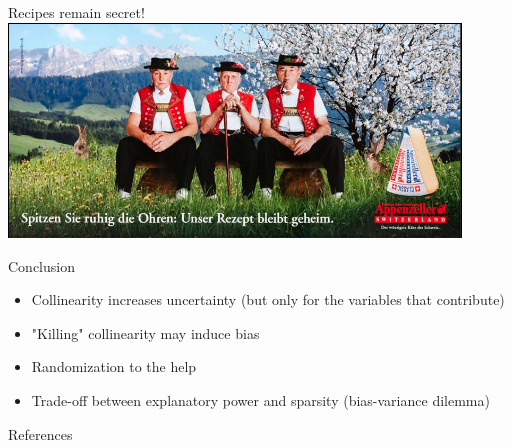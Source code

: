 \documentclass[english]{beamer}\usepackage[]{graphicx}\usepackage[]{xcolor}
\begin{document}
\begin{frame}{ }
Recipes remain secret!
\centering
\includegraphics[width=0.9\textwidth]{appenzeller.png}

\end{frame}
\begin{frame}{Conclusion}

\begin{itemize}
\item Collinearity increases uncertainty (but only for the variables that contribute)
\item "Killing" collinearity may induce bias
\item Randomization to the help
\item Trade-off between explanatory power and sparsity (bias-variance dilemma)
\end{itemize}


\end{frame}
\begin{frame}{References}
  \small
  


\end{frame}


\end{document}
